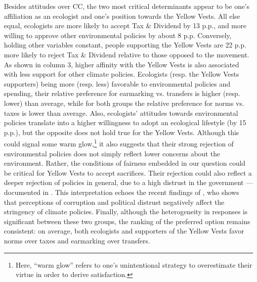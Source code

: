 \documentclass[english,5p,authoryear]{elsarticle}
\begin{document}
Besides attitudes over CC, the two most critical determinants appear to be one's affiliation as an ecologist and one's position towards the Yellow Vests. All else equal, ecologists are more likely to accept Tax \& Dividend by 13 p.p., and more willing to approve other environmental policies by about 8 p.p. Conversely, holding other variables constant, people supporting the Yellow Vests are 22 p.p. more likely to reject Tax \& Dividend relative to those opposed to the movement. As shown in column 3, higher affinity with the Yellow Vests is also associated with less support for other climate policies. Ecologists (resp. the Yellow Vests supporters) being more (resp. less) favorable to environmental policies and spending, their relative preference for earmarking vs. transfers is higher (resp. lower) than average, while for both groups the relative preference for norms vs. taxes is lower than average. Also, ecologists' attitudes towards environmental policies translate into a higher willingness to adopt an ecological lifestyle (by 15 p.p.), but the opposite does not hold true for the Yellow Vests. Although this could signal some warm glow,\footnote{Here, ``warm glow'' refers to one's unintentional strategy to overestimate their virtue in order to derive satisfaction.} it also suggests that their strong rejection of environmental policies does not simply reflect lower concerns about the environment. Rather, the conditions of fairness embedded in our question could be critical for Yellow Vests to accept sacrifices. Their rejection could also reflect a deeper rejection of policies in general, due to a high distrust in the government --- documented in \citet{algan_et_al_19}. This interpretation echoes the recent findings of \citet{rafaty_perceptions_2018}, who shows that perceptions of corruption and political distrust negatively affect the stringency of climate policies. Finally, although the heterogeneity in responses is significant between these two groups, the ranking of the preferred option remains consistent: on average, both ecologists and supporters of the Yellow Vests favor norms over taxes and earmarking over transfers. 
\end{document}
